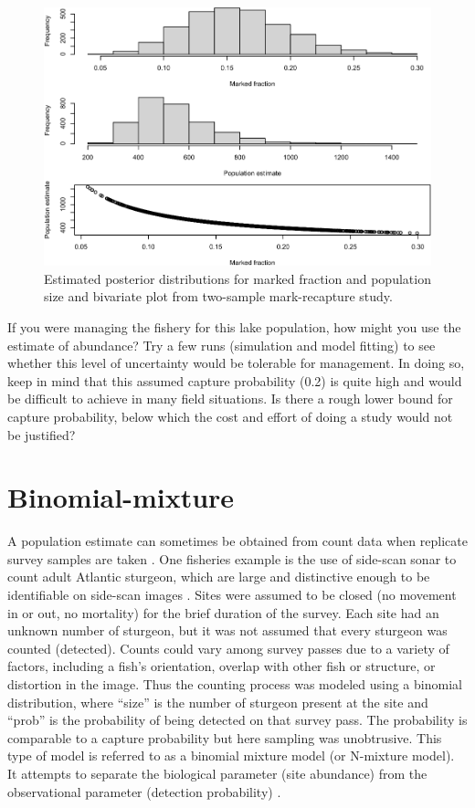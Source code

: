 \documentclass[
]{krantz}
\begin{document}
\begin{figure}
\includegraphics[width=0.9\linewidth]{bookdown_files/figure-latex/PopEst-covary-1} \caption{Estimated posterior distributions for marked fraction and population size and bivariate plot from two-sample mark-recapture study.}\label{fig:PopEst-covary}
\end{figure}

If you were managing the fishery for this lake population, how might you use the estimate of abundance? Try a few runs (simulation and model fitting) to see whether this level of uncertainty would be tolerable for management. In doing so, keep in mind that this assumed capture probability (0.2) is quite high and would be difficult to achieve in many field situations. Is there a rough lower bound for capture probability, below which the cost and effort of doing a study would not be justified?

\hypertarget{binomial-mixture}{%
\section{Binomial-mixture}\label{binomial-mixture}}

A population estimate can sometimes be obtained from count data when replicate survey samples are taken \citep{kéry.schaub_2011}. One fisheries example is the use of side-scan sonar to count adult Atlantic sturgeon, which are large and distinctive enough to be identifiable on side-scan images \citep{flowers.hightower_2013, flowers.hightower2015}. Sites were assumed to be closed (no movement in or out, no mortality) for the brief duration of the survey. Each site had an unknown number of sturgeon, but it was not assumed that every sturgeon was counted (detected). Counts could vary among survey passes due to a variety of factors, including a fish's orientation, overlap with other fish or structure, or distortion in the image. Thus the counting process was modeled using a binomial distribution, where ``size'' is the number of sturgeon present at the site and ``prob'' is the probability of being detected on that survey pass. The probability is comparable to a capture probability but here sampling was unobtrusive. This type of model is referred to as a binomial mixture model (or N-mixture model). It attempts to separate the biological parameter (site abundance) from the observational parameter (detection probability) \citep{kéry.schaub_2011}.
\end{document}
